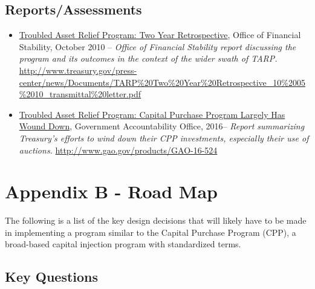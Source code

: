 \documentclass[12pt]{article}
\begin{document}
\subsection{Reports/Assessments}

\begin{itemize}
\item
\ul{Troubled
 Asset Relief Program: Two Year Retrospective}, Office of Financial
 Stability, October 2010 -- \emph{Office of Financial Stability report
 discussing the program and its outcomes in the context of the wider
 swath of TARP.} \url{http://www.treasury.gov/press-center/news/Documents/TARP\%20Two\%20Year\%20Retrospective_10\%2005\%2010_transmittal\%20letter.pdf}

 \item
\ul{Troubled Asset Relief Program: Capital Purchase Program Largely Has Wound Down}, Government Accountability Office, 2016-- \emph{Report summarizing Treasury's efforts to wind down their CPP investments, especially their use of auctions.} \url{http://www.gao.gov/products/GAO-16-524}
 
 
 
\end{itemize}

\section{Appendix B - Road Map}

The following is a list of the key design decisions that will likely have to be made in implementing a program similar to the Capital Purchase Program (CPP), a broad-based capital injection program with standardized terms.

\subsection{Key Questions}
\end{document}
